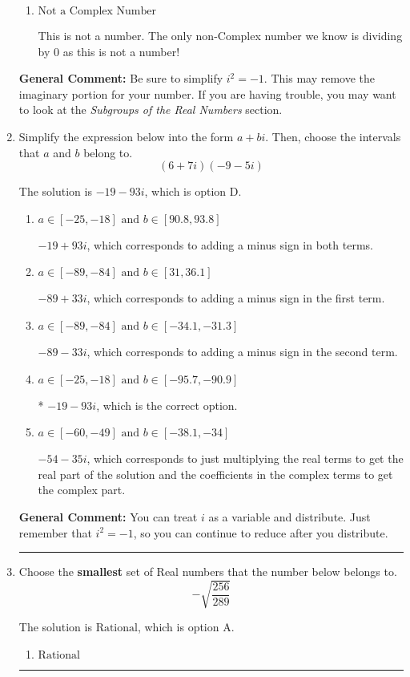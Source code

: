 \documentclass{extbook}[14pt]
\newcommand{\litem}[1]{\item #1

\rule{\textwidth}{0.4pt}}
\begin{document}
\begin{enumerate}
{\begin{enumerate}[label=\Alph*.]
This is a Complex number $(a+bi)$ that \textbf{only} has an imaginary part like $2i$.
\item \( \text{Not a Complex Number} \)

This is not a number. The only non-Complex number we know is dividing by 0 as this is not a number!
\end{enumerate}

\textbf{General Comment:} Be sure to simplify $i^2 = -1$. This may remove the imaginary portion for your number. If you are having trouble, you may want to look at the \textit{Subgroups of the Real Numbers} section.
}
\litem{
Simplify the expression below into the form $a+bi$. Then, choose the intervals that $a$ and $b$ belong to.
\[ (6 + 7 i)(-9 - 5 i) \]

The solution is \( -19 - 93 i \), which is option D.\begin{enumerate}[label=\Alph*.]
\item \( a \in [-25, -18] \text{ and } b \in [90.8, 93.8] \)

 $-19 + 93 i$, which corresponds to adding a minus sign in both terms.
\item \( a \in [-89, -84] \text{ and } b \in [31, 36.1] \)

 $-89 + 33 i$, which corresponds to adding a minus sign in the first term.
\item \( a \in [-89, -84] \text{ and } b \in [-34.1, -31.3] \)

 $-89 - 33 i$, which corresponds to adding a minus sign in the second term.
\item \( a \in [-25, -18] \text{ and } b \in [-95.7, -90.9] \)

* $-19 - 93 i$, which is the correct option.
\item \( a \in [-60, -49] \text{ and } b \in [-38.1, -34] \)

 $-54 - 35 i$, which corresponds to just multiplying the real terms to get the real part of the solution and the coefficients in the complex terms to get the complex part.
\end{enumerate}

\textbf{General Comment:} You can treat $i$ as a variable and distribute. Just remember that $i^2=-1$, so you can continue to reduce after you distribute.
}
\litem{
Choose the \textbf{smallest} set of Real numbers that the number below belongs to.
\[ -\sqrt{\frac{256}{289}} \]

The solution is \( \text{Rational} \), which is option A.\begin{enumerate}[label=\Alph*.]
\item \( \text{Rational} \)


\end{enumerate}}
\end{enumerate}
\end{document}
